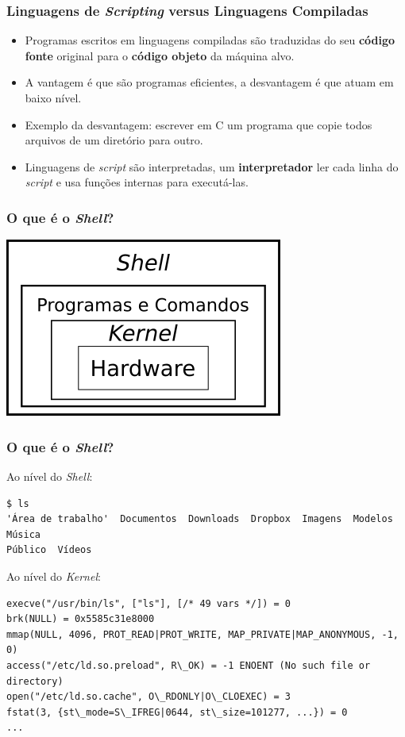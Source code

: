 \documentclass{beamer}
\begin{document}
\begin{frame}
   \frametitle{Linguagens de \textit{Scripting} versus Linguagens Compiladas}
   \begin{itemize}
      \item Programas escritos em linguagens compiladas são traduzidas do seu \textbf{código fonte} original para o \textbf{código objeto} da máquina alvo.
      \item A vantagem é que são programas eficientes, a desvantagem é que atuam em baixo nível.
      \item Exemplo da desvantagem: escrever em C um programa que copie todos arquivos de um diretório para outro.
      \item Linguagens de \textit{script} são interpretadas, um \textbf{interpretador} ler cada linha do \textit{script} e usa funções internas para executá-las.
   \end{itemize}
\end{frame}

\begin{frame}
   \frametitle{O que é o \textit{Shell}?}
   \centering
   \includegraphics[scale=0.8]{figuras/camadas.png}
\end{frame}

\begin{frame}[fragile]
      \frametitle{O que é o \textit{Shell}?}
	      \scriptsize
      \begin{block}{Ao nível do \textit{Shell}:}
      \begin{verbatim}
$ ls 
'Área de trabalho'  Documentos  Downloads  Dropbox  Imagens  Modelos  Música 
Público  Vídeos
      \end{verbatim}
      \end{block}
      \begin{block}{Ao nível do \textit{Kernel}:}
      \scriptsize
      \begin{verbatim}
execve("/usr/bin/ls", ["ls"], [/* 49 vars */]) = 0 
brk(NULL) = 0x5585c31e8000 
mmap(NULL, 4096, PROT_READ|PROT_WRITE, MAP_PRIVATE|MAP_ANONYMOUS, -1, 0) 
access("/etc/ld.so.preload", R\_OK) = -1 ENOENT (No such file or directory) 
open("/etc/ld.so.cache", O\_RDONLY|O\_CLOEXEC) = 3 
fstat(3, {st\_mode=S\_IFREG|0644, st\_size=101277, ...}) = 0 
...
      \end{verbatim}
      \end{block}
\end{frame}
\end{document}
